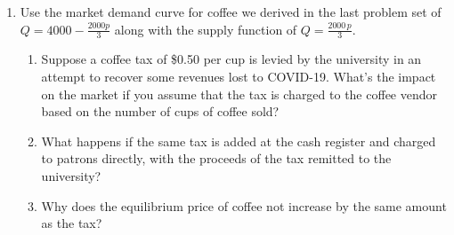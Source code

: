 \documentclass[11pt,]{article}
\providecommand{\tightlist}{%
  \setlength{\itemsep}{0pt}\setlength{\parskip}{0pt}}
\begin{document}
\newpage

\begin{enumerate}
\def\labelenumi{\arabic{enumi}.}
\setcounter{enumi}{1}
\tightlist
\item
  Use the market demand curve for coffee we derived in the last problem
  set of \(Q=4000-\frac{2000p}{3}\) along with the supply function of
  \(Q=\frac{2000\,p}{3}\).

  \begin{enumerate}
  \def\labelenumii{\alph{enumii})}
  \tightlist
  \item
    Suppose a coffee tax of \$0.50 per cup is levied by the university
    in an attempt to recover some revenues lost to COVID-19. What's the
    impact on the market if you assume that the tax is charged to the
    coffee vendor based on the number of cups of coffee sold?
  \item
    What happens if the same tax is added at the cash register and
    charged to patrons directly, with the proceeds of the tax remitted
    to the university?
  \item
    Why does the equilibrium price of coffee not increase by the same
    amount as the tax?
  \end{enumerate}
\end{enumerate}

\newpage
\end{document}
